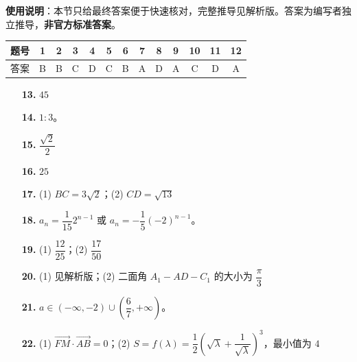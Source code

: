 
\begin{gknotice}
\textbf{使用说明}：本节只给最终答案便于快速核对，完整推导见解析版。答案为编写者独立推导，\textbf{非官方标准答案}。
\end{gknotice}

\begin{center}\begin{tabular}{ccccccccccccc}
\toprule
题号 & 1 & 2 & 3 & 4 & 5 & 6 & 7 & 8 & 9 & 10 & 11 & 12 \\
\midrule
答案 & B & B & C & D & C & B & A & D & A & C & D & A \\
\bottomrule
\end{tabular}\end{center}

\begin{itemize}[leftmargin=2.6em]
  \item[\textbf{13.}] $45$
  \item[\textbf{14.}] $1:3$。
  \item[\textbf{15.}] $\dfrac{\sqrt2}{2}$
  \item[\textbf{16.}] $25$
\end{itemize}

\begin{itemize}[leftmargin=2.6em]
  \item[\textbf{17.}] (1) $BC=3\sqrt2$；(2) $CD=\sqrt{13}$
  \item[\textbf{18.}] $a_n=\dfrac1{15}2^{n-1}$ 或 $a_n=-\dfrac15(-2)^{n-1}$。
  \item[\textbf{19.}] (1) $\dfrac{12}{25}$；(2) $\dfrac{17}{50}$
  \item[\textbf{20.}] (1) 见解析版；(2) 二面角 $A_1-AD-C_1$ 的大小为 $\dfrac\pi3$
  \item[\textbf{21.}] $a\in(-\infty,-2)\cup\left(\dfrac67,+\infty\right)$。
  \item[\textbf{22.}] (1) $\overrightarrow{FM}\cdot\overrightarrow{AB}=0$；(2) $S=f(\lambda)=\dfrac12\left(\sqrt\lambda+\dfrac1{\sqrt\lambda}\right)^3$，最小值为 $4$
\end{itemize}
